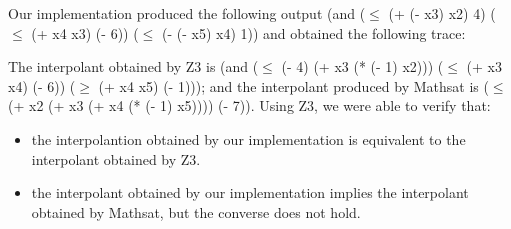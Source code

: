 Our implementation produced the following output
(and
($\leq$ (+ (- x3) x2) 4)
($\leq$ (+ x4 x3) (- 6))
($\leq$ (- (- x5) x4) 1))
and obtained the following trace:



The interpolant obtained by Z3 is 
(and ($\leq$ (- 4) (+ x3 (* (- 1) x2))) ($\leq$ (+ x3 x4) (- 6)) ($\geq$ (+ x4 x5) (- 1))); 
and the interpolant produced by Mathsat is ($\leq$ (+ x2 (+ x3 (+ x4 (* (- 1) x5)))) (- 7)).
Using Z3, we were able to verify that: 
\begin{itemize}
  \item the interpolantion obtained by our implementation
    is equivalent to the interpolant obtained by Z3. 
  \item the interpolant obtained by our implementation implies the interpolant
    obtained by Mathsat, but the converse does not hold.
\end{itemize}





